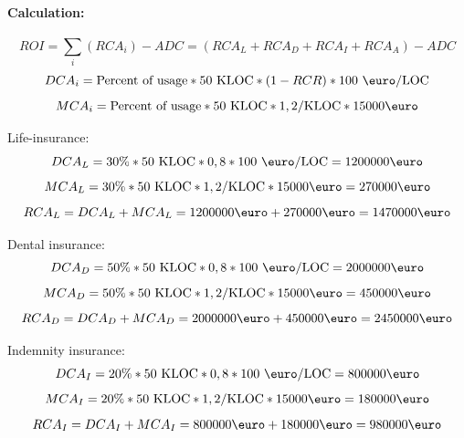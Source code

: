 \documentclass[a4paper,12pt,oneside]{scrreprt}
\begin{document}
\paragraph{Calculation:}
\begin{equation*}
	ROI = \sum_i(RCA_i) - ADC = (RCA_L + RCA_D + RCA_I + RCA_A) - ADC
\end{equation*}
\begin{equation*}
	DCA_i = \text{Percent of usage} * 50 \text{ KLOC} * (1 - RCR) * 100 \text{ \euro/LOC}
\end{equation*}
\begin{equation*}
	MCA_i = \text{Percent of usage} * 50 \text{ KLOC} * 1,2/\text{KLOC} * 15000\text{\euro}
\end{equation*}

Life-insurance:
\begin{equation*}
	DCA_L = 30\% * 50 \text{ KLOC} * 0,8 * 100\text{ \euro/LOC} = 1200000 \text{\euro}
\end{equation*}
\begin{equation*}
	MCA_L = 30\% * 50 \text{ KLOC} * 1,2/\text{KLOC} * 15000\text{\euro} = 270000\text{\euro}
\end{equation*}
\begin{equation*}
	RCA_L = DCA_L + MCA_L = 1200000\text{\euro} + 270000\text{\euro} = 1470000\text{\euro}
\end{equation*}

Dental insurance:
\begin{equation*}
	DCA_D = 50\% * 50 \text{ KLOC} * 0,8 * 100\text{ \euro/LOC} = 2000000 \text{\euro}
\end{equation*}
\begin{equation*}
	MCA_D = 50\% * 50 \text{ KLOC} * 1,2/\text{KLOC} * 15000\text{\euro} = 450000\text{\euro}
\end{equation*}
\begin{equation*}
	RCA_D = DCA_D + MCA_D = 2000000\text{\euro} + 450000\text{\euro} = 2450000\text{\euro}
\end{equation*}

Indemnity insurance:
\begin{equation*}
	DCA_I = 20\% * 50 \text{ KLOC} * 0,8 * 100\text{ \euro/LOC} = 800000 \text{\euro}
\end{equation*}
\begin{equation*}
	MCA_I = 20\% * 50 \text{ KLOC} * 1,2/\text{KLOC} * 15000\text{\euro} = 180000\text{\euro}
\end{equation*}
\begin{equation*}
	RCA_I = DCA_I + MCA_I = 800000\text{\euro} + 180000\text{\euro} = 980000\text{\euro}
\end{equation*}
\end{document}
